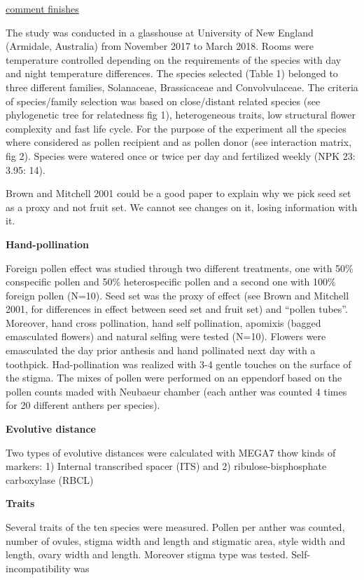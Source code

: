 \documentclass[11pt,a4paper]{article}
\begin{document}
\href{}{comment finishes}

The study was conducted in a glasshouse at University of New England
(Armidale, Australia) from November 2017 to March 2018. Rooms were
temperature controlled depending on the requirements of the species with
day and night temperature differences. The species selected (Table 1)
belonged to three different families, Solanaceae, Brassicaceae and
Convolvulaceae. The criteria of species/family selection was based on
close/distant related species (see phylogenetic tree for relatedness fig
1), heterogeneous traits, low structural flower complexity and fast life
cycle. For the purpose of the experiment all the species where
considered as pollen recipient and as pollen donor (see interaction
matrix, fig 2). Species were watered once or twice per day and
fertilized weekly (NPK 23: 3.95: 14).

Brown and Mitchell 2001 could be a good paper to explain why we pick
seed set as a proxy and not fruit set. We cannot see changes on it,
losing information with it.

\textbf{Hand-pollination}

Foreign pollen effect was studied through two different treatments, one
with 50\% conspecific pollen and 50\% heterospecific pollen and a second
one with 100\% foreign pollen (N=10). Seed set was the proxy of effect
(see Brown and Mitchell 2001, for differences in effect between seed set
and fruit set) and ``pollen tubes''. Moreover, hand cross pollination,
hand self pollination, apomixis (bagged emasculated flowers) and natural
selfing were tested (N=10). Flowers were emasculated the day prior
anthesis and hand pollinated next day with a toothpick. Had-pollination
was realized with 3-4 gentle touches on the surface of the stigma. The
mixes of pollen were performed on an eppendorf based on the pollen
counts maded with Neubaeur chamber (each anther was counted 4 times for
20 different anthers per species).

\textbf{Evolutive distance}

Two types of evolutive distances were calculated with MEGA7 thow kinds
of markers: 1) Internal transcribed spacer (ITS) and 2)
ribulose-bisphosphate carboxylase (RBCL)

\textbf{Traits}

Several traits of the ten species were measured. Pollen per anther was
counted, number of ovules, stigma width and length and stigmatic area,
style width and length, ovary width and length. Moreover stigma type was
tested. Self-incompatibility was
\end{document}
